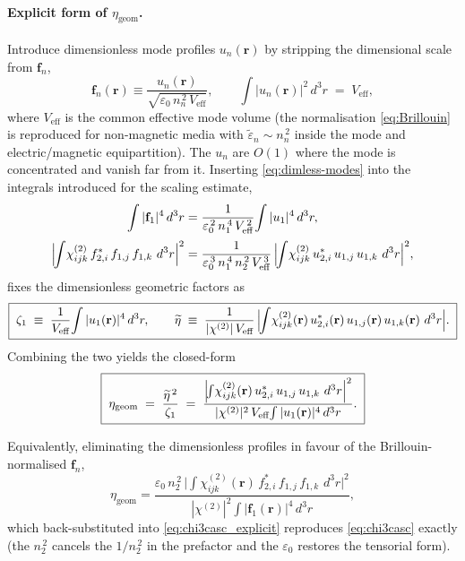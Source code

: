\documentclass[11pt,a4paper]{article}
\newcommand{\eps}{\varepsilon}
\newcommand{\bvec}[1]{\mathbf{#1}}
\newcommand{\f}{\bvec{f}}
\newcommand{\ri}{\bvec{r}}
\newcommand{\dthreer}{\,d^{3}r}
\newcommand{\chitwo}{\chi^{(2)}}
\begin{document}
\paragraph{Explicit form of $\eta_\text{geom}$.}
Introduce dimensionless mode profiles $u_n(\ri)$ by stripping the
dimensional scale from $\f_n$,
\begin{equation}
  \f_n(\ri)\equiv\frac{u_n(\ri)}{\sqrt{\eps_0\,n_n^{\,2}\,V_\text{eff}}},
  \qquad
  \int|u_n(\ri)|^{2}\dthreer\;=\;V_\text{eff},
  \label{eq:dimless-modes}
\end{equation}
where $V_\text{eff}$ is the common effective mode volume (the
normalisation \eqref{eq:Brillouin} is reproduced for non-magnetic media
with $\widetilde\eps_n\!\sim\!n_n^{\,2}$ inside the mode and electric/magnetic
equipartition). The $u_n$ are $O(1)$ where the mode is concentrated and
vanish far from it. Inserting \eqref{eq:dimless-modes} into the integrals
introduced for the scaling estimate,
\begin{align}
  \int|\f_1|^{4}\dthreer
    &=\frac{1}{\eps_0^{\,2}\,n_1^{\,4}\,V_\text{eff}^{\,2}}\!\int|u_1|^{4}\dthreer,\\[2pt]
  \Bigl|\!\int\!\chitwo_{ijk}\,f_{2,i}^{*}\,f_{1,j}\,f_{1,k}\,\dthreer\Bigr|^{2}
    &=\frac{1}{\eps_0^{\,3}\,n_1^{\,4}\,n_2^{\,2}\,V_\text{eff}^{\,3}}\,
       \Bigl|\!\int\!\chitwo_{ijk}\,u_{2,i}^{*}\,u_{1,j}\,u_{1,k}\,\dthreer\Bigr|^{2},
\end{align}
fixes the dimensionless geometric factors as
\begin{equation}
  \boxed{\;
  \zeta_{1}\;\equiv\;\frac{1}{V_\text{eff}}\!\int|u_{1}(\ri)|^{4}\dthreer,
  \qquad
  \widetilde\eta\;\equiv\;\frac{1}{|\chitwo|\,V_\text{eff}}\,
        \Bigl|\!\int\!\chitwo_{ijk}(\ri)\,u_{2,i}^{*}(\ri)\,u_{1,j}(\ri)\,u_{1,k}(\ri)\,\dthreer\Bigr|.
  \;}
  \label{eq:zeta1-etatilde}
\end{equation}
Combining the two yields the closed-form
\begin{equation}
  \boxed{\;
  \eta_\text{geom}\;=\;\frac{\widetilde\eta^{\,2}}{\zeta_1}
   \;=\;
   \frac{\Bigl|\!\int\!\chitwo_{ijk}(\ri)\,u_{2,i}^{*}\,u_{1,j}\,u_{1,k}\,\dthreer\Bigr|^{2}}
        {|\chitwo|^{2}\,V_\text{eff}\!\int|u_{1}(\ri)|^{4}\dthreer}.
  \;}
  \label{eq:eta-geom-explicit}
\end{equation}

Equivalently, eliminating the dimensionless profiles in favour of the
Brillouin-normalised $\f_n$,
\begin{equation}
  \eta_\text{geom}
   =\frac{\eps_0\,n_2^{\,2}\,
          \bigl|\!\int\!\chitwo_{ijk}(\ri)\,f_{2,i}^{*}\,f_{1,j}\,f_{1,k}\,\dthreer\bigr|^{2}}
         {|\chitwo|^{2}\!\int|\f_1(\ri)|^{4}\dthreer},
  \label{eq:eta-geom-f}
\end{equation}
which back-substituted into \eqref{eq:chi3casc_explicit} reproduces
\eqref{eq:chi3casc} exactly (the $n_2^{\,2}$ cancels the $1/n_2^{\,2}$ in the
prefactor and the $\eps_0$ restores the tensorial form).
\end{document}

